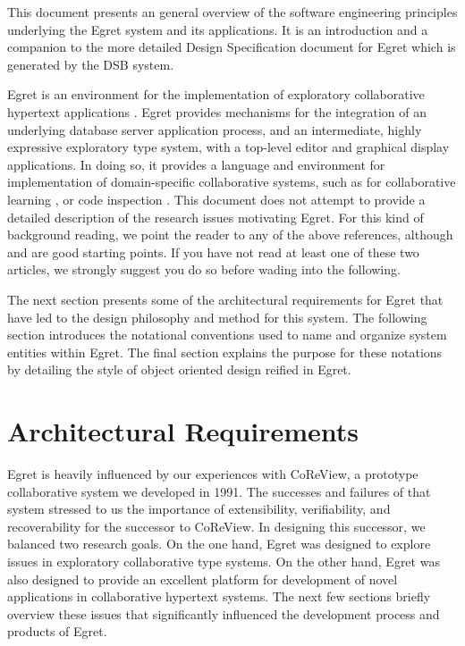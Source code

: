 This document presents an general overview of the software engineering
principles underlying the Egret system and its applications. It is an
introduction and a companion to the more detailed Design Specification
document for Egret which is generated by the DSB system.

Egret is an environment for the implementation of exploratory
collaborative hypertext applications \cite{csdl-91-03,csdl-92-01}.
Egret provides mechanisms for the integration of an underlying
database server application process, and an intermediate, highly
expressive exploratory type system, with a top-level editor and
graphical display applications.  In doing so, it provides a language
and environment for implementation of domain-specific collaborative
systems, such as for collaborative learning
\cite{csdl-92-03,csdl-92-05,csdl-93-01}, or code inspection
\cite{csdl-92-04,csdl-92-07}.  This document does not attempt to
provide a detailed description of the research issues motivating
Egret. For this kind of background reading, we point the reader to any
of the above references, although \cite{csdl-92-01} and
\cite{csdl-92-03} are good starting points.  If you have not read at
least one of these two articles, we strongly suggest you do so before
wading into the following.

The next section presents some of the architectural requirements for
Egret that have led to the design philosophy and method for this
system. The following section introduces the notational conventions
used to name and organize system entities within Egret.  The final 
section explains the purpose for these notations by detailing the
style of object oriented design reified in Egret.  

\section{Architectural Requirements}

Egret is heavily influenced by our experiences with CoReView, a
prototype collaborative system we developed in 1991.  The successes
and failures of that system stressed to us the importance of
extensibility, verifiability, and recoverability for the successor to
CoReView.  In designing this successor, we balanced two research
goals.  On the one hand, Egret was designed to explore issues in
exploratory collaborative type systems.  On the other hand, Egret was
also designed to provide an excellent platform for development of
novel applications in collaborative hypertext systems.  The next few
sections briefly overview these issues that significantly influenced
the development process and products of Egret.

